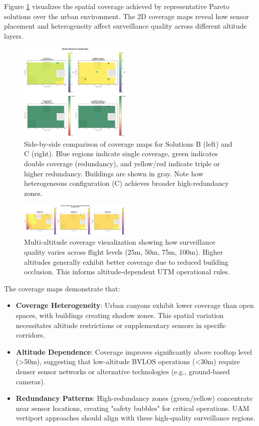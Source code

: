 Figure \ref{fig:coverage_maps} visualizes the spatial coverage achieved by representative Pareto solutions over the urban environment. The 2D coverage maps reveal how sensor placement and heterogeneity affect surveillance quality across different altitude layers.

\begin{figure}[t]
  \centering
  \includegraphics[width=0.48\textwidth]{figures/pareto_comparison.png}
  \caption{Side-by-side comparison of coverage maps for Solutions B (left) and C (right). Blue regions indicate single coverage, green indicates double coverage (redundancy), and yellow/red indicate triple or higher redundancy. Buildings are shown in gray. Note how heterogeneous configuration (C) achieves broader high-redundancy zones.}
  \label{fig:coverage_maps}
\end{figure}

\begin{figure}[t]
  \centering
  \includegraphics[width=0.48\textwidth]{figures/pareto_multi_altitude.png}
  \caption{Multi-altitude coverage visualization showing how surveillance quality varies across flight levels (25m, 50m, 75m, 100m). Higher altitudes generally exhibit better coverage due to reduced building occlusion. This informs altitude-dependent UTM operational rules.}
  \label{fig:multi_altitude}
\end{figure}

The coverage maps demonstrate that:

\begin{itemize}
\item \textbf{Coverage Heterogeneity}: Urban canyons exhibit lower coverage than open spaces, with buildings creating shadow zones. This spatial variation necessitates altitude restrictions or supplementary sensors in specific corridors.

\item \textbf{Altitude Dependence}: Coverage improves significantly above rooftop level (>50m), suggesting that low-altitude BVLOS operations (<30m) require denser sensor networks or alternative technologies (e.g., ground-based cameras).

\item \textbf{Redundancy Patterns}: High-redundancy zones (green/yellow) concentrate near sensor locations, creating "safety bubbles" for critical operations. UAM vertiport approaches should align with these high-quality surveillance regions.
\end{itemize}

